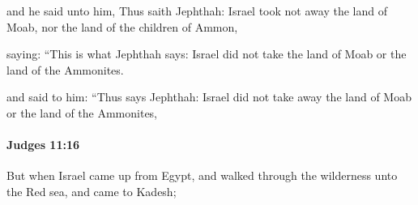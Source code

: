 			\begin{versebox}
					\item[BHS] 
					\item[ASV] and he said unto him, Thus saith Jephthah: Israel took not away the land of Moab, nor the land of the children of Ammon,
					\item[NIV] saying: “This is what Jephthah says: Israel did not take the land of Moab or the land of the Ammonites.
					\item[NRSV] and said to him: “Thus says Jephthah: Israel did not take away the land of Moab or the land of the Ammonites,
			\end{versebox}

		\paragraph{Judges 11:16} %
			\label{JUDGES-11-16}

			But when Israel came up from Egypt, and walked through the wilderness unto the Red sea, and came to Kadesh;

